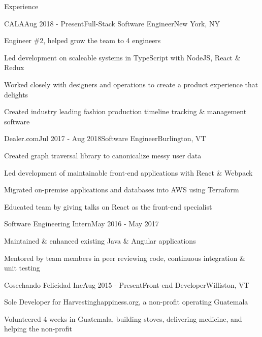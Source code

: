\documentclass{resume} %
\begin{document}

\begin{rSection}{Experience}


\begin{rSubsection}{CALA}{Aug 2018 - Present}{Full-Stack Software Engineer}{New York, NY}
    \item Engineer \#2, helped grow the team to 4 engineers
    \item Led development on scaleable systems in TypeScript with NodeJS, React \& Redux
    \item Worked closely with designers and operations to create a product experience that delights
    \item Created industry leading fashion production timeline tracking \& management software
\end{rSubsection}


\begin{rSubsection}{Dealer.com}{Jul 2017 - Aug 2018}{Software Engineer}{Burlington, VT}
    \item Created graph traversal library to canonicalize messy user data
    \item Led development of maintainable front-end applications with React \& Webpack
    \item Migrated on-premise applications and databases into AWS using Terraform
    \item Educated team by giving talks on React as the front-end specialist
\end{rSubsection}

\begin{sSubsection}{Software Engineering Intern}{May 2016 - May 2017}
    \item Maintained \& enhanced existing Java \& Angular applications
    \item Mentored by team members in peer reviewing code, continuous integration \& unit testing
\end{sSubsection}


\begin{rSubsection}{Cosechando Felicidad Inc}{Aug 2015 - Present}{Front-end Developer}{Williston, VT}
    \item Sole Developer for Harvestinghappiness.org, a non-profit operating Guatemala
    \item Volunteered 4 weeks in Guatemala, building stoves, delivering medicine, and helping the non-profit
\end{rSubsection}


\end{rSection}
\end{document}
